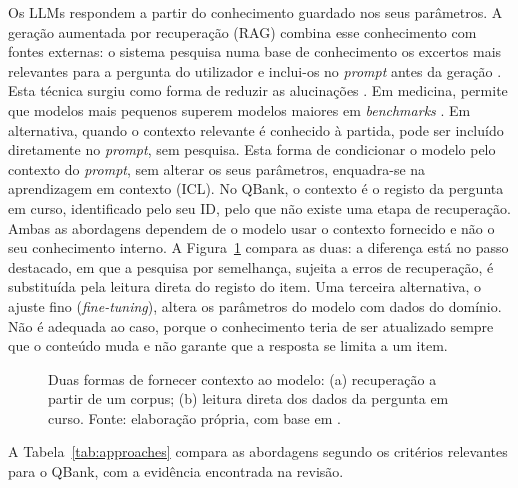 Os \glspl{LLM} respondem a partir do conhecimento guardado nos seus parâmetros. A geração aumentada por recuperação (\gls{RAG}) combina esse conhecimento com fontes externas: o sistema pesquisa numa base de conhecimento os excertos mais relevantes para a pergunta do utilizador e inclui-os no \emph{prompt} antes da geração \parencite{hu2025advancing}. Esta técnica surgiu como forma de reduzir as alucinações \parencite{wu2023brief}. Em medicina, permite que modelos mais pequenos superem modelos maiores em \emph{benchmarks} \parencite{hu2025advancing}. Em alternativa, quando o contexto relevante é conhecido à partida, pode ser incluído diretamente no \emph{prompt}, sem pesquisa. Esta forma de condicionar o modelo pelo contexto do \emph{prompt}, sem alterar os seus parâmetros, enquadra-se na aprendizagem em contexto (\gls{ICL}). No QBank, o contexto é o registo da pergunta em curso, identificado pelo seu ID, pelo que não existe uma etapa de recuperação. Ambas as abordagens dependem de o modelo usar o contexto fornecido e não o seu conhecimento interno. A Figura~\ref{fig:context} compara as duas: a diferença está no passo destacado, em que a pesquisa por semelhança, sujeita a erros de recuperação, é substituída pela leitura direta do registo do item. Uma terceira alternativa, o ajuste fino (\emph{fine-tuning}), altera os parâmetros do modelo com dados do domínio. Não é adequada ao caso, porque o conhecimento teria de ser atualizado sempre que o conteúdo muda e não garante que a resposta se limita a um item.

\begin{figure}[htbp]
\centering

\caption[Duas formas de fornecer contexto ao modelo]{Duas formas de fornecer contexto ao modelo: (a) recuperação a partir de um corpus; (b) leitura direta dos dados da pergunta em curso. Fonte: elaboração própria, com base em \textcite{hu2025advancing}.}
\label{fig:context}
\end{figure}

A Tabela~\ref{tab:approaches} compara as abordagens segundo os critérios relevantes para o QBank, com a evidência encontrada na revisão.

